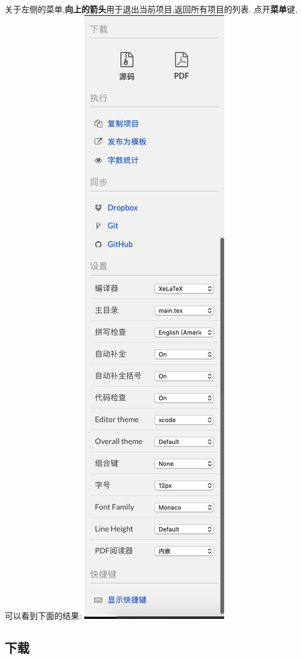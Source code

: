\documentclass[]{ctexbook}
\begin{document}
关于左侧的菜单,\textbf{向上的箭头}用于退出当前项目,返回所有项目的列表.
点开\textbf{菜单}键,可以看到下面的结果:
\includegraphics{figure/menu.jpg}

\hypertarget{downloadsource}{%
\subsection{下载}\label{downloadsource}}
\end{document}
